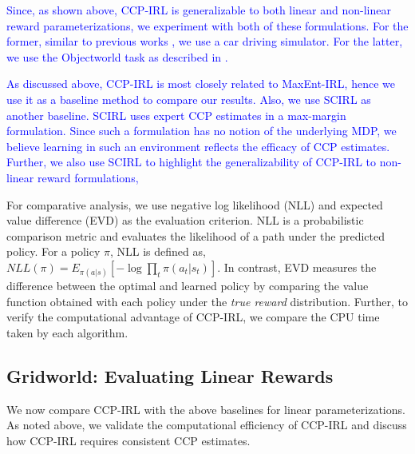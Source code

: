 \documentclass{article}
\begin{document}
\textcolor{blue}{
Since, as shown above, CCP-IRL is generalizable to both linear and non-linear reward parameterizations, we experiment with both of these formulations. For the former, similar to previous works \cite{abbeel2004apprenticeship, klein2012inverse}, we use a car driving simulator. For the latter, we use the Objectworld task as described in \cite{Levine2013}. 
}

\textcolor{blue}{
 As discussed above, CCP-IRL is most closely related to MaxEnt-IRL, hence we use it as a baseline method to compare our results. Also, we use SCIRL as another baseline.
SCIRL uses expert CCP estimates in a max-margin formulation. Since such a formulation has no notion of the underlying MDP, we believe learning in such an environment reflects the efficacy of CCP estimates. Further, we also use SCIRL to highlight the generalizability of CCP-IRL to non-linear reward formulations, 
}

 For comparative analysis, we use negative log likelihood (NLL) \cite{kitani2012activity} and expected value difference (EVD) \cite{levine2011nonlinear} as the evaluation criterion. NLL is a probabilistic comparison metric and evaluates the likelihood of a path under the predicted policy. For a policy $\pi$, NLL is defined as, $NLL(\pi) = E_{\pi(a|s)}\left[-\log \prod_{t} \pi(a_{t}|s_{t}) \right]$.
In contrast, EVD measures the difference between the optimal and learned policy by comparing the value function obtained with each policy under the \textit{true reward} distribution. Further, to verify the computational advantage of CCP-IRL, we compare the CPU time taken by each algorithm.



\subsection{Gridworld: Evaluating Linear Rewards} 

We now compare CCP-IRL with the above baselines for linear parameterizations. As noted above, we validate the computational efficiency of CCP-IRL and discuss how CCP-IRL requires consistent CCP estimates.
\end{document}
